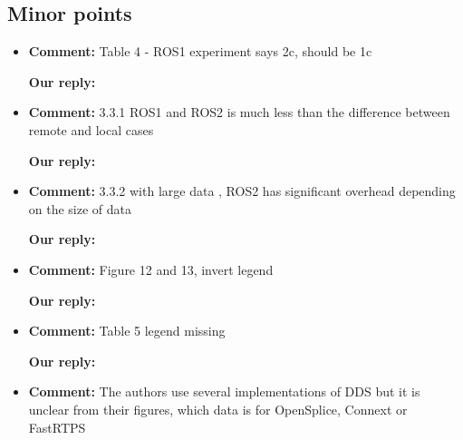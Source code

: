 \documentclass{article}
\begin{document}
\subsection{Minor points}
\begin{itemize}

\item \begin{flushleft}
    \textbf{Comment:} Table 4 - ROS1 experiment says 2c, should be 1c
  \end{flushleft}

  \begin{flushleft}
    \textbf{Our reply:}
  \end{flushleft}


\item \begin{flushleft}
    \textbf{Comment:} 3.3.1 ROS1 and ROS2 is much less than the difference between remote and local cases
  \end{flushleft}

  \begin{flushleft}
    \textbf{Our reply:}
  \end{flushleft}


\item \begin{flushleft}
    \textbf{Comment:} 3.3.2 with large data , ROS2 has significant overhead depending on the size of data
  \end{flushleft}

  \begin{flushleft}
    \textbf{Our reply:}
  \end{flushleft}


\item \begin{flushleft}
    \textbf{Comment:} Figure 12 and 13, invert legend
  \end{flushleft}

  \begin{flushleft}
    \textbf{Our reply:}
  \end{flushleft}


\item \begin{flushleft}
    \textbf{Comment:} Table 5 legend missing
  \end{flushleft}

  \begin{flushleft}
    \textbf{Our reply:}
  \end{flushleft}


\item \begin{flushleft}
    \textbf{Comment:} The authors use several implementations of DDS but it is unclear from their figures, which data is for OpenSplice, Connext or FastRTPS
  \end{flushleft}


\end{itemize}
\end{document}
